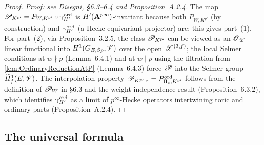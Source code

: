 %
\begin{proof}
  \textit{Proof: see Disegni, §6.3--6.4 and Proposition~A.2.4.}
  The map $\mathscr{P}_{K^{p\prime}} = P_{W,K^{p\prime}} \circ \gamma^{\mathrm{ord}}_{H'}$ is
  $H'(\mathbf{A}^{p\infty})$-invariant because both $P_{W,K^{p\prime}}$ (by construction)
  and $\gamma^{\mathrm{ord}}_{H'}$ (a Hecke-equivariant projector) are; this gives part~(1).
  For part~(2), via Proposition~3.2.5, the class $\mathscr{P}_{K^{p\prime}}$ can be viewed as an
  $\mathscr{O}_{\mathscr{X}}$-linear functional into $H^1(G_{E,Sp}, \mathscr{V})$ over the open $\mathscr{X}^{(3,f)}$;
  the local Selmer conditions at $w \nmid p$ (Lemma~6.4.1) and at $w \mid p$ using the
  filtration from \cref{lem:OrdinaryReductionAtP} (Lemma~6.4.3) force $\mathscr{P}$ into the
  Selmer group $\widetilde{H}^1_f(E,\mathscr{V})$.  The interpolation property
  $\mathscr{P}_{K^{p\prime}|z} = P^{\mathrm{ord}}_{\Pi_z, K^{p\prime}}$ follows from the definition of
  $\mathscr{P}_W$ in §6.3 and the weight-independence result (Proposition~6.3.2), which
  identifies $\gamma^{\mathrm{ord}}_{H'}$ as a limit of $p^\infty$-Hecke operators intertwining
  toric and ordinary parts (Proposition~A.2.4).
\end{proof}

\subsection{The universal formula}

